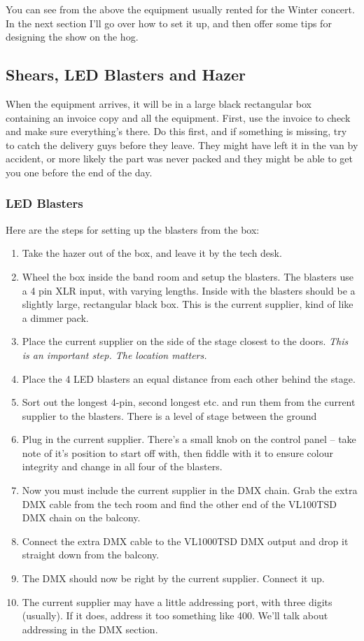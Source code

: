 \documentclass[letterpaper,10pt,oneside,headsepline]{scrreprt}
\begin{document}
You can see from the above the equipment usually rented for the Winter concert. In the next section I'll go over how to set it up, and then offer some tips for designing the show on the hog.

\subsection{Shears, LED Blasters and Hazer}
When the equipment arrives, it will be in a large black rectangular box containing an invoice copy and all the equipment. First, use the invoice to check and make sure everything's there. Do this first, and if something is missing, try to catch the delivery guys before they leave. They might have left it in the van by accident, or more likely the part was never packed and they might be able to get you one before the end of the day.
\subsubsection{LED Blasters}
Here are the steps for setting up the blasters from the box:
\begin{enumerate}
\item Take the hazer out of the box, and leave it by the tech desk.
\item Wheel the box inside the band room and setup the blasters. The blasters use a 4 pin XLR input, with varying lengths. Inside with the blasters should be a slightly large, rectangular black box. This is the current supplier, kind of like a dimmer pack.
\item Place the current supplier on the side of the stage closest to the doors. \textit{This is an important step. The location matters.}
\item Place the 4 LED blasters an equal distance from each other behind the stage. 
\item Sort out the longest 4-pin, second longest etc. and run them from the current supplier to the blasters. There is a level of stage between the ground

\item Plug in the current supplier. There's a small knob on the control panel -- take note of it's position to start off with, then fiddle with it to ensure colour integrity and change in all four of the blasters. 
\item Now you must include the current supplier in the DMX chain. Grab the extra DMX cable from the tech room and find the other end of the VL100TSD DMX chain on the balcony.
\item Connect the extra DMX cable to the VL1000TSD DMX output and drop it straight down from the balcony.
\item The DMX should now be right by the current supplier. Connect it up.
\item The current supplier may have a little addressing port, with three digits (usually). If it does, address it too something like 400. We'll talk about addressing in the DMX section.
\end{enumerate}
\end{document}
